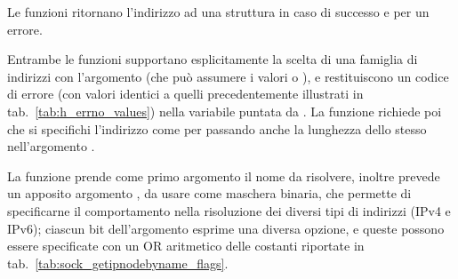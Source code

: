 \begin{funcproto}{
}

{Le funzioni ritornano l'indirizzo ad una struttura  in caso
  di successo e  per un errore.}
\end{funcproto}

Entrambe le funzioni supportano esplicitamente la scelta di una famiglia di
indirizzi con l'argomento  (che può assumere i valori
 o ), e restituiscono un codice di errore
(con valori identici a quelli precedentemente illustrati in
tab.~\ref{tab:h_errno_values}) nella variabile puntata da .
La funzione  richiede poi che si specifichi l'indirizzo
come per  passando anche la lunghezza dello stesso
nell'argomento .

La funzione  prende come primo argomento il nome da
risolvere, inoltre prevede un apposito argomento , da usare come
maschera binaria, che permette di specificarne il comportamento nella
risoluzione dei diversi tipi di indirizzi (IPv4 e IPv6); ciascun bit
dell'argomento esprime una diversa opzione, e queste possono essere specificate
con un OR aritmetico delle costanti riportate in
tab.~\ref{tab:sock_getipnodebyname_flags}.

